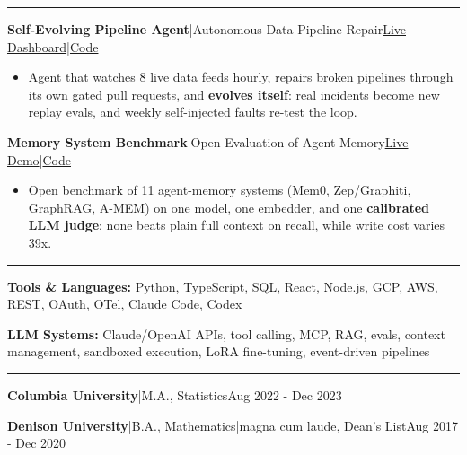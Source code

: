 \documentclass[letterpaper]{article}
\newcommand{\sep}{\enspace|\enspace}
\newcommand{\name}[1]{{\bfseries#1}}
\newcommand{\when}[1]{\hfill#1\par}
\newcommand{\heading}[1]{\addvspace{4.5bp}{\fontsize{11bp}{13bp}\selectfont\bfseries#1\par}
  \vspace{3.5bp}\hrule\vspace{5bp}}
\begin{document}
\heading{PROJECTS}
\name{Self-Evolving Pipeline Agent}\sep Autonomous Data Pipeline Repair\when{\href{https://b-cmd-alt.github.io/pipelineagent/}{Live Dashboard}\sep\href{https://github.com/B-cmd-alt/pipelineagent}{Code}}
\begin{itemize}
  \item Agent that watches 8 live data feeds hourly, repairs broken pipelines through its own gated pull requests, and \textbf{evolves itself}: real incidents become new replay evals, and weekly self-injected faults re-test the loop.
\end{itemize}
\name{Memory System Benchmark}\sep Open Evaluation of Agent Memory\when{\href{https://memory-evaluator-862698383291.us-central1.run.app}{Live Demo}\sep\href{https://github.com/B-cmd-alt/memory-evaluator}{Code}}
\begin{itemize}
  \item Open benchmark of 11 agent-memory systems (Mem0, Zep/Graphiti, GraphRAG, A-MEM) on one model, one embedder, and one \textbf{calibrated LLM judge}; none beats plain full context on recall, while write cost varies 39x.
\end{itemize}

\heading{SKILLS}
\name{Tools \& Languages:} Python, TypeScript, SQL, React, Node.js, GCP, AWS, REST, OAuth, OTel, Claude Code, Codex\par
\vspace{1bp}
\name{LLM Systems:} Claude/OpenAI APIs, tool calling, MCP, RAG, evals, context management, sandboxed execution, LoRA fine-tuning, event-driven pipelines\par

\heading{EDUCATION}
\name{Columbia University}\sep M.A., Statistics\when{Aug 2022 - Dec 2023}
\vspace{1bp}
\name{Denison University}\sep B.A., Mathematics\sep magna cum laude, Dean's List\when{Aug 2017 - Dec 2020}
\end{document}
